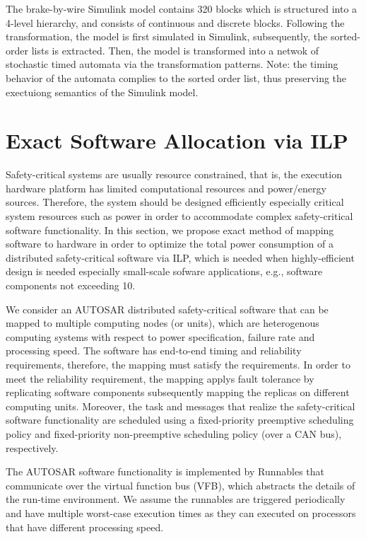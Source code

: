 The brake-by-wire Simulink model contains 320 blocks which is structured into a 4-level hierarchy, and consists of continuous and discrete blocks. Following the transformation, the model is first simulated in Simulink, subsequently, the sorted-order lists is extracted. Then, the model is transformed into a netwok of stochastic timed automata via the transformation patterns. Note: the timing behavior of the automata complies to the sorted order list, thus preserving the exectuiong semantics of the Simulink model.

\section{Exact Software Allocation  via ILP}\label{rc_ilp}
Safety-critical systems are usually resource constrained, that is, the execution hardware platform has limited computational resources and power/energy sources. Therefore, the system should be designed efficiently especially critical system resources such as power in order to accommodate complex safety-critical software functionality. In this section, we propose exact method of mapping software to hardware in order to optimize the total power consumption of a distributed safety-critical software via ILP, which is needed when highly-efficient design is needed especially small-scale sofware applications, e.g., software components not exceeding 10.

We consider an AUTOSAR distributed safety-critical software that can be mapped to multiple computing nodes (or units), which are heterogenous computing systems with respect to power specification, failure rate and processing speed. The software has end-to-end timing and reliability requirements, therefore, the mapping must satisfy the requirements. In order to meet the reliability requirement, the mapping applys fault tolerance by replicating software components subsequently mapping the replicas on different computing units. Moreover, the task and messages that realize the safety-critical software functionality are scheduled using a fixed-priority preemptive scheduling policy and fixed-priority non-preemptive scheduling policy (over a  CAN bus), respectively.

The AUTOSAR software functionality is implemented by Runnables that communicate over the virtual function bus (VFB), which abstracts the details of the run-time environment. We assume the runnables are triggered periodically and have multiple worst-case execution times as they can executed on processors that have different processing speed.

